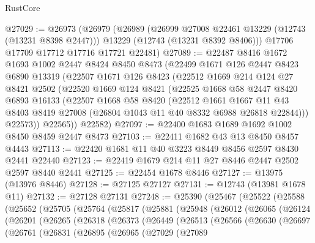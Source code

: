 \begin{lexlean}{RustCore}
\begin{coremodule}
@27029 := @26973
    (@26979
      (@26989
        (@26999 @27008 @22461 @13229 (@12743 (@13231 @8398 @2447)))
        @13229
        (@12743 (@13231 @8392 @8406)))
      @17706
      @17709
      @17712
      @17716
      @17721
      @22481)
@27089 := @22487
    @8416
    @1672
    @1693
    @1002
    @2447
    @8424
    @8450
    @8473
    (@22499
      @1671
      @126
      @2447
      @8423
      @6890
      @13319
      (@22507
        @1671
        @126
        @8423
        (@22512
          @1669
          @214
          @124
          @27
          @8421
          @2502
          (@22520
            @1669
            @124
            @8421
            (@22525
              @1668
              @58
              @2447
              @8420
              @6893
              @16133
              (@22507
                @1668
                @58
                @8420
                (@22512
                  @1661
                  @1667
                  @11
                  @43
                  @8403
                  @8419
                  @27008
                  (@26804 @1043 @11 @40 @8332 @6988 @26818 @22844)))
              @22573))
          @22565))
      @22582)
@27097 := @22400 @1683 @1689 @1692 @1002 @8450 @8459 @2447 @8473
@27103 := @22411 @1682 @43 @13 @8450 @8457 @4443
@27113 := @22420 @1681 @11 @40 @3223 @8449 @8456 @2597 @8430 @2441 @22440
@27123 := @22419 @1679 @214 @11 @27 @8446 @2447 @2502 @2597 @8440 @2441
@27125 := @22454 @1678 @8446
@27127 := @13975 (@13976 @8446)
@27128 := @27125 @27127
@27131 := @12743 (@13981 @1678 @11)
@27132 := @27128 @27131
@27248 := @25390
    (@25467
      (@25522
        (@25588
          (@25652
            (@25705
              (@25764
                (@25817
                  (@25881
                    (@25948
                      (@26012
                        (@26065
                          (@26124
                            (@26201
                              (@26265
                                (@26318
                                  (@26373
                                    (@26449
                                      (@26513
                                        (@26566
                                          (@26630
                                            (@26697
                                              (@26761
                                                (@26831
                                                  (@26895
                                                    (@26965
                                                      (@27029
                                                        (@27089

\end{coremodule}
\end{lexlean}
